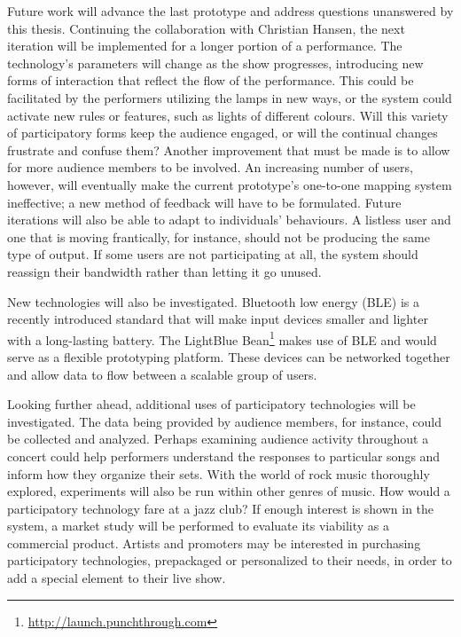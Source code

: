 Future work will advance the last prototype and address questions unanswered by this thesis. Continuing the collaboration with Christian Hansen, the next iteration will be implemented for a longer portion of a performance. The technology's parameters will change as the show progresses, introducing new forms of interaction that reflect the flow of the performance. This could be facilitated by the performers utilizing the lamps in new ways, or the system could activate new rules or features, such as lights of different colours. Will this variety of participatory forms keep the audience engaged, or will the continual changes frustrate and confuse them? Another improvement that must be made is to allow for more audience members to be involved. An increasing number of users, however, will eventually make the current prototype's one-to-one mapping system ineffective; a new method of feedback will have to be formulated. Future iterations will also be able to adapt to individuals' behaviours. A listless user and one that is moving frantically, for instance, should not be producing the same type of output. If some users are not participating at all, the system should reassign their bandwidth rather than letting it go unused.

New technologies will also be investigated. Bluetooth low energy (BLE) is a recently introduced standard that will make input devices smaller and lighter with a long-lasting battery. The LightBlue Bean\footnote{\url{http://launch.punchthrough.com}} makes use of BLE and would serve as a flexible prototyping platform. These devices can be networked together and allow data to flow between a scalable group of users.

Looking further ahead, additional uses of participatory technologies will be investigated. The data being provided by audience members, for instance, could be collected and analyzed. Perhaps examining audience activity throughout a concert could help performers understand the responses to particular songs and inform how they organize their sets. With the world of rock music thoroughly explored, experiments will also be run within other genres of music. How would a participatory technology fare at a jazz club? If enough interest is shown in the system, a market study will be performed to evaluate its viability as a commercial product. Artists and promoters may be interested in purchasing participatory technologies, prepackaged or personalized to their needs, in order to add a special element to their live show.


